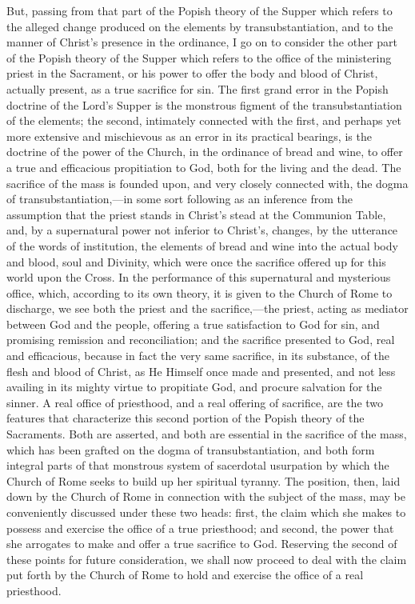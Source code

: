 \documentclass[]{book}
\begin{document}
But, passing from that part of the Popish theory of the Supper which refers to the alleged change produced on the elements by transubstantiation, and to the manner of Christ's presence in the ordinance, I go on to consider the other part of the Popish theory of the Supper which refers to the office of the ministering priest in the Sacrament, or his power to offer the body and blood of Christ, actually present, as a true sacrifice for sin. The first grand error in the Popish doctrine of the Lord's Supper is the monstrous figment of the transubstantiation of the elements; the second, intimately connected with the first, and perhaps yet more extensive and mischievous as an error in its practical bearings, is the doctrine of the power of the Church, in the ordinance of bread and wine, to offer a true and efficacious propitiation to God, both for the living and the dead. The sacrifice of the mass is founded upon, and very closely connected with, the dogma of transubstantiation,---in some sort following as an inference from the assumption that the priest stands in Christ's stead at the Communion Table, and, by a supernatural power not inferior to Christ's, changes, by the utterance of the words of institution, the elements of bread and wine into the actual body and blood, soul and Divinity, which were once the sacrifice offered up for this world upon the Cross. In the performance of this supernatural and mysterious office, which, according to its own theory, it is given to the Church of Rome to discharge, we see both the priest and the sacrifice,---the priest, acting as mediator between God and the people, offering a true satisfaction to God for sin, and promising remission and reconciliation; and the sacrifice presented to God, real and efficacious, because in fact the very same sacrifice, in its substance, of the flesh and blood of Christ, as He Himself once made and presented, and not less availing in its mighty virtue to propitiate God, and procure salvation for the sinner. A real office of priesthood, and a real offering of sacrifice, are the two features that characterize this second portion of the Popish theory of the Sacraments. Both are asserted, and both are essential in the sacrifice of the mass, which has been grafted on the dogma of transubstantiation, and both form integral parts of that monstrous system of sacerdotal usurpation by which the Church of Rome seeks to build up her spiritual tyranny. The position, then, laid down by the Church of Rome in connection with the subject of the mass, may be conveniently discussed under these two heads: first, the claim which she makes to possess and exercise the office of a true priesthood; and second, the power that she arrogates to make and offer a true sacrifice to God. Reserving the second of these points for future consideration, we shall now proceed to deal with the claim put forth by the Church of Rome to hold and exercise the office of a real priesthood.
\end{document}
